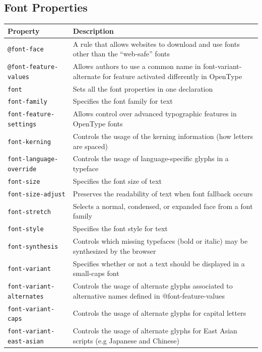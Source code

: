 \documentclass[11pt, letterpaper]{article}
\begin{document}
		\subsection{Font Properties}
			\begin{longtable}{p{5cm} p{10cm}}
				\toprule
				Property & Description \\\midrule 
				\texttt{@font-face} & A rule that allows websites to download and use fonts other than the ``web-safe'' fonts \\\midrule
				\texttt{@font-feature-values} & Allows authors to use a common name in font-variant-alternate for feature activated differently in OpenType \\\midrule
				\texttt{font} & Sets all the font properties in one declaration \\\midrule
				\texttt{font-family} & Specifies the font family for text \\\midrule
				\texttt{font-feature-settings} & Allows control over advanced typographic features in OpenType fonts \\\midrule
				\texttt{font-kerning} & Controls the usage of the kerning information (how letters are spaced) \\\midrule
				\texttt{font-language-override} & Controls the usage of language-specific glyphs in a typeface \\\midrule
				\texttt{font-size} & Specifies the font size of text \\\midrule
				\texttt{font-size-adjust} & Preserves the readability of text when font fallback occurs \\\midrule
				\texttt{font-stretch} & Selects a normal, condensed, or expanded face from a font family \\\midrule
				\texttt{font-style} & Specifies the font style for text \\\midrule
				\texttt{font-synthesis} & Controls which missing typefaces (bold or italic) may be synthesized by the browser \\\midrule
				\texttt{font-variant} & Specifies whether or not a text should be displayed in a small-caps font \\\midrule
				\texttt{font-variant-alternates} & Controls the usage of alternate glyphs associated to alternative names defined in @font-feature-values \\\midrule
				\texttt{font-variant-caps} & Controls the usage of alternate glyphs for capital letters \\\midrule
				\texttt{font-variant-east-asian} & Controls the usage of alternate glyphs for East Asian scripts (e.g Japanese and Chinese) \\\midrule

\end{longtable}
\end{document}
